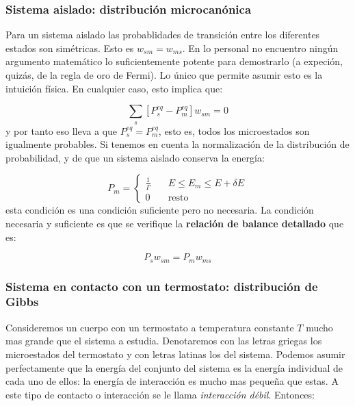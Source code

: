 \documentclass[12pt,a4paper]{article}
\numberwithin{equation}{section}
\numberwithin{figure}{section}
\newcommand{\ccorchetes}[1]{\left[ #1  \right]}
\theoremstyle{definition}
\begin{document}
\subsubsection{Sistema aislado: distribución microcanónica}

Para un sistema aislado las probablidades de transición entre los diferentes estados son simétricas. Esto es $w_{sm}=w_{ms}$. En lo personal no encuentro ningún argumento matemático lo suficientemente potente para demostrarlo (a expeción, quizás, de la regla de oro de Fermi). Lo único que permite asumir esto es la intuición física. En cualquier caso, esto implica que:

\begin{equation}
\sum_s \ccorchetes{ P_s^{eq}  - P_m^{eq}} w_{sm}= 0 
\end{equation}
y por tanto eso lleva a que $P_s^{eq} = P_m^{eq}$, esto es, todos los microestados son igualmente probables. Si tenemos en cuenta la normalización de la distribución de probabilidad, y de que un sistema aislado conserva la energía:

\begin{equation}
P_m  = \left\lbrace \begin{array}{ll}
\frac{1}{\Gamma} \quad & E \leq E_m \leq E+ \delta E \\
0 \quad  & \mathrm{resto}
\end{array} \right.
\end{equation}
esta condición es una condición suficiente pero no necesaria. La condición necesaria y suficiente es que se verifique la \textbf{relación de balance detallado} que es:

\begin{equation}
P_s w_{sm} = P_m w_{ms}
\end{equation}

\subsubsection{Sistema en contacto con un termostato: distribución de Gibbs}

Consideremos un cuerpo con un termostato a temperatura constante $T$ mucho mas grande que el sistema a estudia. Denotaremos con las letras griegas los microestados del termostato y con letras latinas los del sistema. Podemos asumir perfectamente que la energía del conjunto del sistema es la energía individual de cada uno de ellos: la energía de interacción es mucho mas pequeña que estas. A este tipo de contacto o interacción se le llama \textit{interacción débil}. Entonces:
\end{document}
